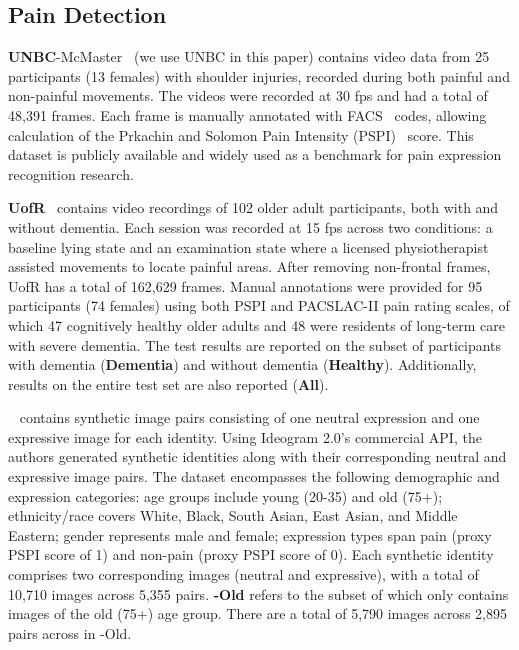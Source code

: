 \documentclass{article}
\theoremstyle{plain}
\theoremstyle{definition}
\theoremstyle{remark}
\begin{document}
\newpage

\subsection{Pain Detection}
\label{sec:pain}

\textbf{UNBC}-McMaster~\citep{lucey2011painful} (we use UNBC in this paper) contains video data from 25 participants (13 females) with shoulder injuries, recorded during both painful and non-painful movements. The videos were recorded at 30 fps and had a total of 48,391 frames. Each frame is manually annotated with FACS~\citep{ekman1978facial} codes, allowing calculation of the Prkachin and Solomon Pain Intensity (PSPI)~\citep{prkachin2008structure} score. This dataset is publicly available and widely used as a benchmark for pain expression recognition research.

\textbf{UofR}~\citep{rezaei2020unobtrusive} contains video recordings of 102 older adult participants, both with and without dementia. Each session was recorded at 15 fps across two conditions: a baseline lying state and an examination state where a licensed physiotherapist assisted movements to locate painful areas. After removing non-frontal frames, UofR has a total of 162,629 frames. Manual annotations were provided for 95 participants (74 females) using both PSPI and PACSLAC-II pain rating scales, of which 47 cognitively healthy older adults and 48 were residents of long-term care with severe dementia. The test results are reported on the subset of participants with dementia (\textbf{Dementia}) and without dementia (\textbf{Healthy}). Additionally, results on the entire test set are also reported (\textbf{All}). 

\textbf{\synpain}~\citep{taati2025synpain} contains synthetic image pairs consisting of one neutral expression and one expressive image for each identity. Using Ideogram 2.0's commercial API, the authors generated synthetic identities along with their corresponding neutral and expressive image pairs. The dataset encompasses the following demographic and expression categories: age groups include young (20-35) and old (75+); ethnicity/race covers White, Black, South Asian, East Asian, and Middle Eastern; gender represents male and female; expression types span pain (proxy PSPI score of 1) and non-pain (proxy PSPI score of 0). Each synthetic identity comprises two corresponding images (neutral and expressive), with a total of 10,710 images across 5,355 pairs. \textbf{\synpain-Old} refers to the subset of \synpain which only contains images of the old (75+) age group. There are a total of 5,790 images across 2,895 pairs across in \synpain-Old.
\end{document}
